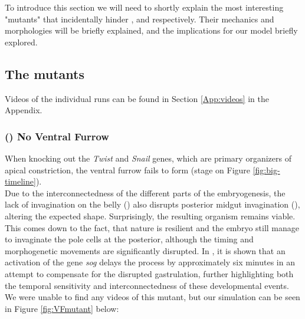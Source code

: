 
To introduce this section we will need to shortly explain the most interesting "mutants" that incidentally hinder ,  and  respectively. Their mechanics and morphologies will be briefly explained, and the implications for our model briefly explored. 

\subsection{The mutants}
Videos of the individual runs can be found in Section \ref{App:videos} in the Appendix. 

\subsubsection{() No Ventral Furrow }
When knocking out the \textit{Twist} and \textit{Snail} genes, which are primary organizers of apical constriction, the ventral furrow fails to form (stage  on Figure \ref{fig:big-timeline}).\cite{leptin1991twist} \\

Due to the interconnectedness of the different parts of the embryogenesis, the lack of invagination on the belly () also disrupts posterior midgut invagination (), altering the expected shape. Surprisingly, the resulting organism remains viable.\cite{conte2012biomechanical} This comes down to the fact, that nature is resilient and the embryo still manage to invaginate the pole cells at the posterior, although the timing and morphogenetic movements are significantly disrupted. In , it is shown that an activation of the gene \textit{sog} delays the process by approximately six minutes in an attempt to compensate for the disrupted gastrulation, further highlighting both the temporal sensitivity and interconnectedness of these developmental events.\\

We were unable to find any videos of this mutant, but our simulation can be seen in Figure \ref{fig:VFmutant} below:

